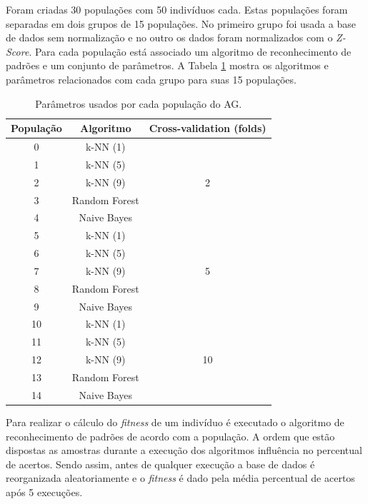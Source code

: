 \documentclass[conference]{IEEEtran}
\begin{document}
Foram criadas 30 populações com 50 indivíduos cada. Estas populações foram separadas em dois grupos de 15 populações. No primeiro grupo foi usada a base de dados sem normalização e no outro os dados foram normalizados com o \textit{Z-Score}. Para cada população está associado um algoritmo de reconhecimento de padrões e um conjunto de parâmetros. A Tabela \ref{tabela:populacoes_do_ag} mostra os algoritmos e parâmetros relacionados com cada grupo para suas 15 populações.

\begin{table}[ht]
  \begin{center}
  \caption{Parâmetros usados por cada população do AG.}
  \label{tabela:populacoes_do_ag}
  \begin{tabular}{|c|c|c|}
  \hline
    \textbf{População} & \textbf{Algoritmo} & \textbf{Cross-validation (folds)} \\
  \hline
    0 & k-NN (1) & \multirow{5}{*}{2} \\
  \cline{1-2}
    1 & k-NN (5) & \\
  \cline{1-2}
    2 & k-NN (9) & \\
  \cline{1-2}
    3 & Random Forest & \\
  \cline{1-2}
    4 & Naive Bayes & \\
  \hline
    5 & k-NN (1) & \multirow{5}{*}{5} \\
  \cline{1-2}
    6 & k-NN (5) & \\
  \cline{1-2}
    7 & k-NN (9) & \\
  \cline{1-2}
    8 & Random Forest & \\
  \cline{1-2}
    9 & Naive Bayes & \\
  \hline
    10 & k-NN (1) & \multirow{5}{*}{10} \\
  \cline{1-2}
    11 & k-NN (5) & \\
  \cline{1-2}
    12 & k-NN (9) & \\
  \cline{1-2}
    13 & Random Forest & \\
  \cline{1-2}
    14 & Naive Bayes & \\
  \hline
  \end{tabular}
  \end{center}
\end{table}

Para realizar o cálculo do \textit{fitness} de um indivíduo é executado o algoritmo de reconhecimento de padrões de acordo com a população. A ordem que estão dispostas as amostras durante a execução dos algoritmos influência no percentual de acertos. Sendo assim, antes de qualquer execução a base de dados é reorganizada aleatoriamente e o \textit{fitness} é dado pela média percentual de acertos após 5 execuções.
\end{document}

